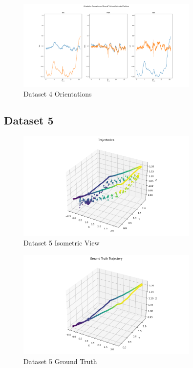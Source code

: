 \documentclass{article}
\begin{document}
\begin{figure}[H]
    \centering
    \includegraphics[width=0.8\textwidth]{./imgs/task1_2/studentdata4_orientation_merged.png}
    \caption{Dataset 4 Orientations}
\end{figure}

\subsection*{Dataset 5}

\begin{figure}[H]
    \centering
    \includegraphics[width=0.8\textwidth]{./imgs/task1_2/studentdata5_isometric.png}
    \caption{Dataset 5 Isometric View}
\end{figure}

\begin{figure}[H]
    \centering
    \includegraphics[width=0.8\textwidth]{./imgs/task1_2/studentdata5_ground_truth.png}
    \caption{Dataset 5 Ground Truth}
\end{figure}
\end{document}
